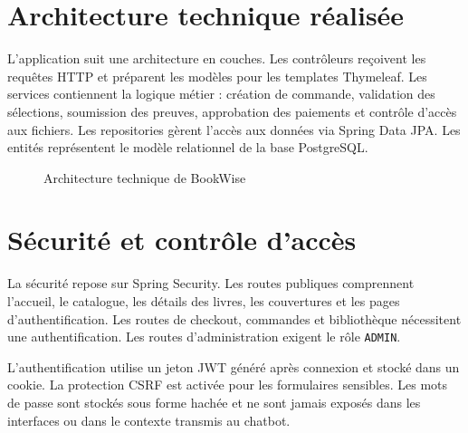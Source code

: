 \documentclass[12pt,a4paper]{report}
\begin{document}
\section{Architecture technique réalisée}

L'application suit une architecture en couches. Les contrôleurs reçoivent les requêtes HTTP et préparent les modèles pour les templates Thymeleaf. Les services contiennent la logique métier : création de commande, validation des sélections, soumission des preuves, approbation des paiements et contrôle d'accès aux fichiers. Les repositories gèrent l'accès aux données via Spring Data JPA. Les entités représentent le modèle relationnel de la base PostgreSQL.

\begin{figure}[htbp]
    \centering
    \caption{Architecture technique de BookWise}
\end{figure}

\section{Sécurité et contrôle d'accès}

La sécurité repose sur Spring Security. Les routes publiques comprennent l'accueil, le catalogue, les détails des livres, les couvertures et les pages d'authentification. Les routes de checkout, commandes et bibliothèque nécessitent une authentification. Les routes d'administration exigent le rôle \texttt{ADMIN}.

L'authentification utilise un jeton JWT généré après connexion et stocké dans un cookie. La protection CSRF est activée pour les formulaires sensibles. Les mots de passe sont stockés sous forme hachée et ne sont jamais exposés dans les interfaces ou dans le contexte transmis au chatbot.
\end{document}
